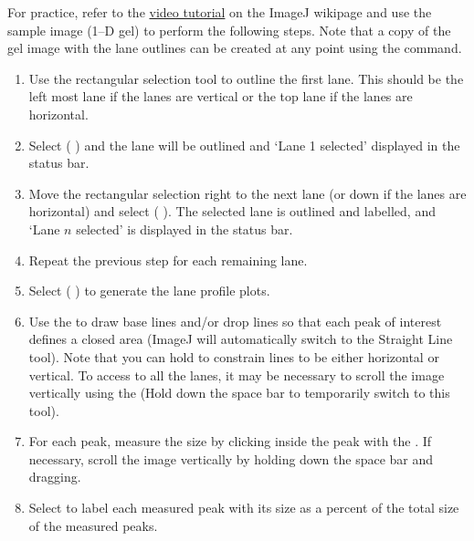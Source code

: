 For practice, refer to the \href{http://imagejdocu.tudor.lu/doku.php?id=video:analysis:gel_quantification_analysis}{video tutorial}
on the ImageJ wikipage and use the {\small {}
}sample image (1--D gel) to perform the following steps. Note that
a copy of the gel image with the lane outlines can be created at any
point using the {\small {}}
command.
\begin{enumerate}
\item Use the rectangular selection tool to outline the first lane. This
should be the left most lane if the lanes are vertical or the top
lane if the lanes are horizontal. 
\item Select (\,\,)
and the lane will be outlined and `Lane 1 selected' displayed in
the status bar. 
\item Move the rectangular selection right to the next lane (or down if
the lanes are horizontal) and select
(\,\,). The selected lane is outlined and labelled,
and `Lane $n$ selected' is displayed in the status bar.
\item Repeat the previous step for each remaining lane. 
\item Select  (\,\,)
to generate the lane profile plots. 
\item Use the  to draw base lines
and/or drop lines so that each peak of interest defines a closed area
(ImageJ will automatically switch to the Straight Line tool). Note
that you can hold  to constrain lines to be either
horizontal or vertical. To access to all the lanes, it may be necessary
to scroll the image vertically using the 
(Hold down the space bar to temporarily switch to this tool). 
\item For each peak, measure the size by clicking inside the peak with the
. If necessary, scroll the image vertically
by holding down the space bar and dragging. 
\item Select  to label each
measured peak with its size as a percent of the total size of the
measured peaks. 
\end{enumerate}

